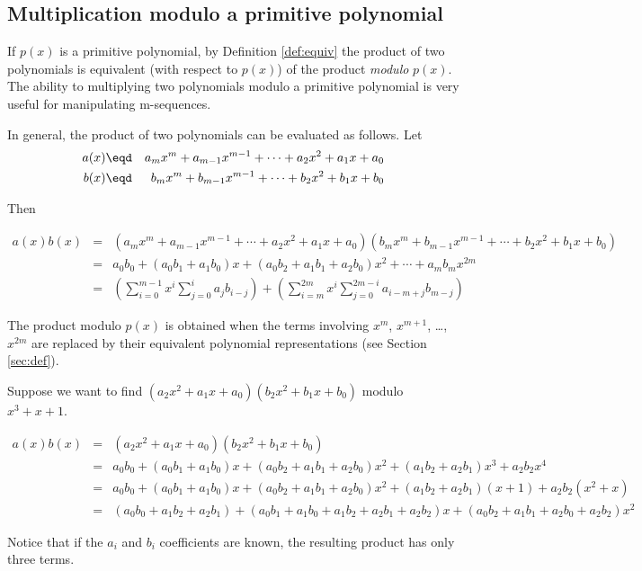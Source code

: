 \subsection{Multiplication modulo a primitive polynomial}
\label{sec:math-xmod}
If $p(x)$ is a primitive polynomial,
by Definition \ref{def:equiv}
the product of two polynomials is equivalent (with respect to $p(x)$)
of the product {\em modulo} $p(x)$.
The ability to multiplying two polynomials modulo a primitive polynomial
is very useful for manipulating m-sequences.

In general, the product of two polynomials can be evaluated as follows.
Let
\begin{eqnarray*}
   a(x) &\eqd& a_mx^m + a_{m-1}x^{m-1} + \cdots + a_2x^2 + a_1x + a_0 \\
   b(x) &\eqd& b_mx^m + b_{m-1}x^{m-1} + \cdots + b_2x^2 + b_1x + b_0
\end{eqnarray*}

Then
\begin{scriptsize}
\begin{eqnarray*}
   a(x)b(x)
        &=& \left( a_mx^m + a_{m-1}x^{m-1} + \cdots + a_2x^2 + a_1x + a_0 \right)
            \left( b_mx^m + b_{m-1}x^{m-1} + \cdots + b_2x^2 + b_1x + b_0 \right)\\
        &=& a_0b_0 + (a_0b_1+a_1b_0)x + (a_0b_2+a_1b_1+a_2b_0)x^2 + \cdots + a_mb_mx^{2m}\\
        &=& \left( \sum\limits_{i=0}^{m-1}x^i \sum\limits_{j=0}^i a_jb_{i-j} \right) +
            \left( \sum\limits_{i=m}^{2m}x^i \sum\limits_{j=0}^{2m-i} a_{i-m+j}b_{m-j} \right)
\end{eqnarray*}
\end{scriptsize}

The product modulo $p(x)$ is obtained when the terms involving
$x^m$, $x^{m+1}$, \ldots, $x^{2m}$ are replaced by their
equivalent polynomial representations
(see Section \ref{sec:def}).

\begin{example}
\label{ex:math-xmod}
Suppose we want to find $(a_2x^2 + a_1x + a_0)(b_2x^2+b_1x+b_0)$ modulo $x^3+x+1$.
\begin{scriptsize}
\begin{eqnarray*}
   a(x)b(x) &=& (a_2x^2+a_1x+a_0)(b_2x^2+b_1x+b_0)
      \\&=& a_0b_0 + (a_0b_1 + a_1b_0)x + (a_0b_2 + a_1b_1 + a_2b_0)x^2 +
            (a_1b_2 + a_2b_1)x^3 + a_2b_2x^4
      \\&=& a_0b_0 + (a_0b_1 + a_1b_0)x + (a_0b_2 + a_1b_1 + a_2b_0)x^2 +
            (a_1b_2 + a_2b_1)(x+1) + a_2b_2(x^2+x)
      \\&=& (a_0b_0 + a_1b_2 + a_2b_1) +
            (a_0b_1 + a_1b_0 + a_1b_2 + a_2b_1 + a_2b_2)x +
            (a_0b_2 + a_1b_1 + a_2b_0 + a_2b_2)x^2
\end{eqnarray*}
\end{scriptsize}
Notice that if the $a_i$ and $b_i$ coefficients are known,
the resulting product has only three terms.
\end{example}


